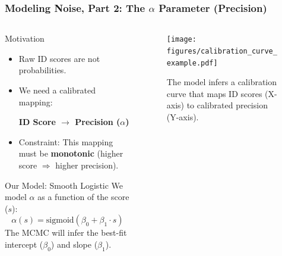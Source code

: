 \documentclass[a4paper,8pt]{beamer}
\begin{document}
\begin{frame}
\frametitle{Modeling Noise, Part 2: The $\alpha$ Parameter (Precision)}

\begin{columns}[T]
    
    \begin{column}{0.5\textwidth}
        \begin{block}{Motivation}
            \begin{itemize}
                \item Raw ID scores are not probabilities.
                \item We need a calibrated mapping:
                \begin{center}
                \textbf{ID Score $\rightarrow$ Precision ($\alpha$)}
                \end{center}
                \item Constraint: This mapping must be \textbf{monotonic} (higher score $\Rightarrow$ higher precision).
            \end{itemize}
        \end{block}
        
        \begin{block}{Our Model: Smooth Logistic}
            We model $\alpha$ as a function of the score ($s$):
            \begin{equation*}
                \alpha(s) = \text{sigmoid}(\beta_0 + \beta_1 \cdot s)
            \end{equation*}
            The MCMC will infer the best-fit intercept ($\beta_0$) and slope ($\beta_1$).
        \end{block}
    \end{column}
    
    \begin{column}{0.45\textwidth}
        \begin{figure}
            \centering
            \texttt{[image: figures/calibration\_curve\_example.pdf]} 
            \caption{The model infers a calibration curve that maps ID scores (X-axis) to calibrated precision (Y-axis).}
        \end{figure}
    \end{column}

\end{columns}
\end{frame}
\end{document}

